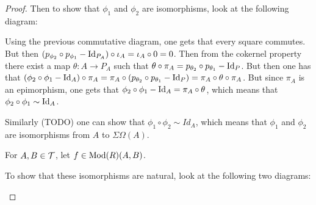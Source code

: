 \begin{proof}
    Then to show that \( \phi_1 \) and \( \phi_2 \) are isomorphisms, look at the following diagram:

    \begin{center}
    \end{center}

    Using the previous commutative diagram, one gets that every square commutes. But then \( (p_{\phi_2} \circ p_{\phi_1} - \operatorname{Id}_{P_A}) \circ \iota_A = \iota_A \circ 0 = 0 \). Then from the cokernel property there exist a map \( \theta: A \to P_A \) such that \( \theta \circ \pi_A = p_{\theta_2} \circ p_{\theta_1} - \operatorname{Id}_P \). But then one has that \( (\phi_2 \circ \phi_1 - \operatorname{Id}_A) \circ \pi_A = \pi_A \circ (p_{\theta_2} \circ p_{\theta_1} - \operatorname{Id}_P) = \pi_A \circ \theta \circ \pi_A \). But since \( \pi_A \) is an epimorphism, one gets that \( \phi_2 \circ \phi_1 - \operatorname{Id}_A = \pi_A \circ \theta \), which means that \( \phi_2 \circ \phi_1 \sim \operatorname{Id}_A \).
    
    Similarly (TODO) one can show that \( \phi_1 \circ \phi_2 \sim Id_A \), which means that \( \phi_1 \) and \( \phi_2 \) are isomorphisms from \( A \) to \( \Sigma\Omega(A) \).

    For \( A, B \in {\mathcal{T}} \), let \( f \in \operatorname{Mod}(R)(A, B) \).

    To show that these isomorphisms are natural, look at the following two diagrams:

    \begin{center}
\end{center}
\end{proof}
